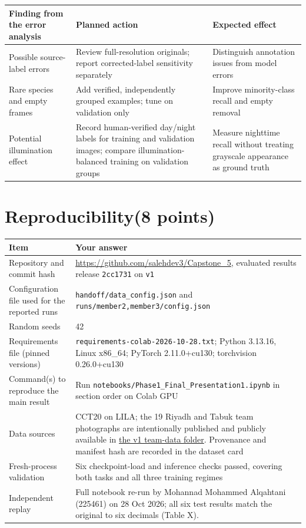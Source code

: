 \documentclass[11pt,a4paper]{article}
\newcommand{\pts}[1]{\texorpdfstring{\hfill{\normalsize\mdseries(#1 points)}}{}}
\begin{document}
\begin{tabularx}{\linewidth}{@{}Y Y Y@{}}
\toprule
Finding from the error analysis & Planned action & Expected effect \\
\midrule
Possible source-label errors & Review full-resolution originals; report corrected-label sensitivity separately & Distinguish annotation issues from model errors \\
Rare species and empty frames & Add verified, independently grouped examples; tune on validation only & Improve minority-class recall and empty removal \\
Potential illumination effect & Record human-verified day/night labels for training and validation images; compare illumination-balanced training on validation groups & Measure nighttime recall without treating grayscale appearance as ground truth \\
\bottomrule
\end{tabularx}

\section{Reproducibility\pts{8}}

\begin{tabularx}{\linewidth}{@{}l Y@{}}
\toprule
Item & Your answer \\
\midrule
Repository and commit hash & \url{https://github.com/salehdev3/Capstone_5}, evaluated results release \texttt{2cc1731} on \texttt{v1} \\
Configuration file used for the reported runs & \texttt{handoff/data\_config.json} and \texttt{runs/member2,member3/config.json} \\
Random seeds & 42 \\
Requirements file (pinned versions) & \texttt{requirements-colab-2026-10-28.txt}; Python 3.13.16, Linux x86\_64; PyTorch 2.11.0+cu130; torchvision 0.26.0+cu130 \\
Command(s) to reproduce the main result & Run \texttt{notebooks/Phase1\_Final\_Presentation1.ipynb} in section order on Colab GPU \\
Data sources & CCT20 on LILA; the 19 Riyadh and Tabuk team photographs are intentionally published and publicly available in \href{https://github.com/salehdev3/Capstone_5/tree/v1/data/team_collected_riyadh}{the v1 team-data folder}. Provenance and manifest hash are recorded in the dataset card \\
Fresh-process validation & Six checkpoint-load and inference checks passed, covering both tasks and all three training regimes \\
Independent replay & Full notebook re-run by Mohannad Mohammed Alqahtani (225461) on 28 Oct 2026; all six test results match the original to six decimals (Table X). \\
\bottomrule
\end{tabularx}
\end{document}
